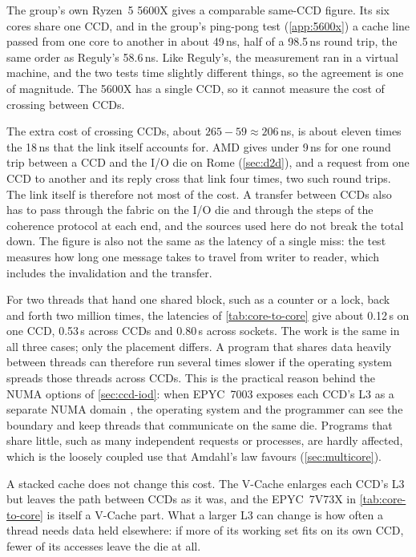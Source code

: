 The group's own Ryzen~5 5600X gives a comparable same-CCD figure. Its six cores share one CCD, and in the group's ping-pong test (\cref{app:5600x}) a cache line passed from one core to another in about 49\,ns, half of a 98.5\,ns round trip, the same order as Reguly's 58.6\,ns. Like Reguly's, the measurement ran in a virtual machine, and the two tests time slightly different things, so the agreement is one of magnitude. The 5600X has a single CCD, so it cannot measure the cost of crossing between CCDs.

The extra cost of crossing CCDs, about $265 - 59 \approx 206$\,ns, is about eleven times the 18\,ns that the link itself accounts for. AMD gives under 9\,ns for one round trip between a CCD and the I/O die on Rome (\cref{sec:d2d}), and a request from one CCD to another and its reply cross that link four times, two such round trips. The link itself is therefore not most of the cost. A transfer between CCDs also has to pass through the fabric on the I/O die and through the steps of the coherence protocol at each end, and the sources used here do not break the total down. The figure is also not the same as the latency of a single miss: the test measures how long one message takes to travel from writer to reader, which includes the invalidation and the transfer.

For two threads that hand one shared block, such as a counter or a lock, back and forth two million times, the latencies of \cref{tab:core-to-core} give about 0.12\,s on one CCD, 0.53\,s across CCDs and 0.80\,s across sockets. The work is the same in all three cases; only the placement differs. A program that shares data heavily between threads can therefore run several times slower if the operating system spreads those threads across CCDs. This is the practical reason behind the NUMA options of \cref{sec:ccd-iod}: when EPYC~7003 exposes each CCD's L3 as a separate NUMA domain \cite{amd2022epyc7003}, the operating system and the programmer can see the boundary and keep threads that communicate on the same die. Programs that share little, such as many independent requests or processes, are hardly affected, which is the loosely coupled use that Amdahl's law favours (\cref{sec:multicore}).

A stacked cache does not change this cost. The V-Cache enlarges each CCD's L3 but leaves the path between CCDs as it was, and the EPYC~7V73X in \cref{tab:core-to-core} is itself a V-Cache part. What a larger L3 can change is how often a thread needs data held elsewhere: if more of its working set fits on its own CCD, fewer of its accesses leave the die at all.

